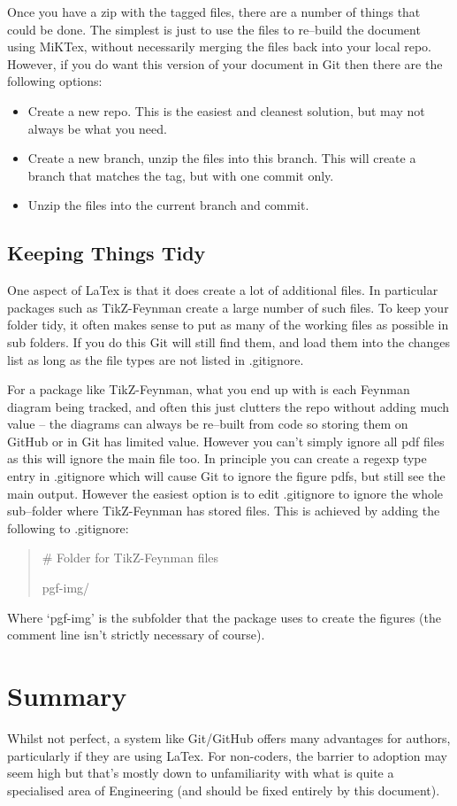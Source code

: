 \documentclass[a4paper, 12pt]{article}
\begin{document}
Once you have a zip with the tagged files, there are a number of things that could be done. The simplest is just to use the files to re--build the document using MiKTex, without necessarily merging the files back into your local repo. However, if you do want this version of your document in Git then there are the following options:
\begin{itemize}
\item Create a new repo. This is the easiest and cleanest solution, but may not always be what you need.
\item Create a new branch, unzip the files into this branch. This will create a branch that matches the tag, but with one commit only.
\item Unzip the files into the current branch and commit.
\end{itemize}


\subsection{Keeping Things Tidy}
One aspect of LaTex is that it does create a lot of additional files. In particular packages such as TikZ-Feynman create a large number of such files. To keep your folder tidy, it often makes sense to put as many of the working files as possible in sub folders. If you do this Git will still find them, and load them into the changes list as long as the file types are not listed in .gitignore.

For a package like TikZ-Feynman, what you end up with is each Feynman diagram being tracked, and often this just clutters the repo without adding much value -- the diagrams can always be re--built from code so storing them on GitHub or in Git has limited value. However you can't simply ignore all pdf files as this will ignore the main file too. In principle you can create a regexp type entry in .gitignore which will cause Git to ignore the figure pdfs, but still see the main output. However the easiest option is to edit .gitignore to ignore the whole sub--folder where TikZ-Feynman has stored files. This is achieved by adding the following to .gitignore:
\begin{quote}\setlength{\parskip}{0pt}
\# Folder for TikZ-Feynman files

pgf-img/
\end{quote}
Where `pgf-img' is the subfolder that the package uses to create the figures (the comment line isn't strictly necessary of course).

\section{Summary}
\label{summary}
Whilst not perfect, a system like Git/GitHub offers many advantages for authors, particularly if they are using LaTex. For non-coders, the barrier to adoption may seem high but that's mostly down to unfamiliarity with what is quite a specialised area of Engineering (and should be fixed entirely by this document).
\end{document}
